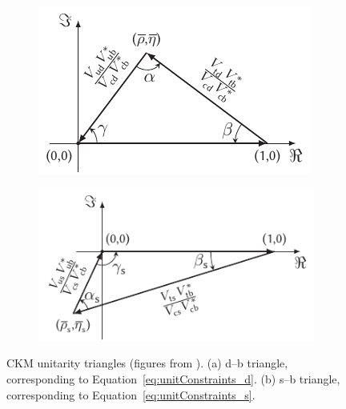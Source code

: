 \begin{figure}[tb]
  \centering
  \begin{subfigure}{0.475\textwidth}
    \raggedright
    \includegraphics[width=\textwidth]{graphics/intro/tikz/b-d-triangle}
    \caption{}
    \label{fig:unitTriangles_bd}
  \end{subfigure}%
  \begin{subfigure}{0.525\textwidth}
    \raggedleft
    \includegraphics[width=\textwidth]{graphics/intro/tikz/b-s-triangle}
    \caption{}
    \label{fig:unitTriangles_bs}
  \end{subfigure}
  \caption{CKM unitarity triangles (figures from \cite{Suvayu}). (a) d--b triangle, corresponding to Equation~\ref{eq:unitConstraints_d}.
           (b) s--b triangle, corresponding to Equation~\ref{eq:unitConstraints_s}.}
  \label{fig:unitTriangles}
\end{figure}


